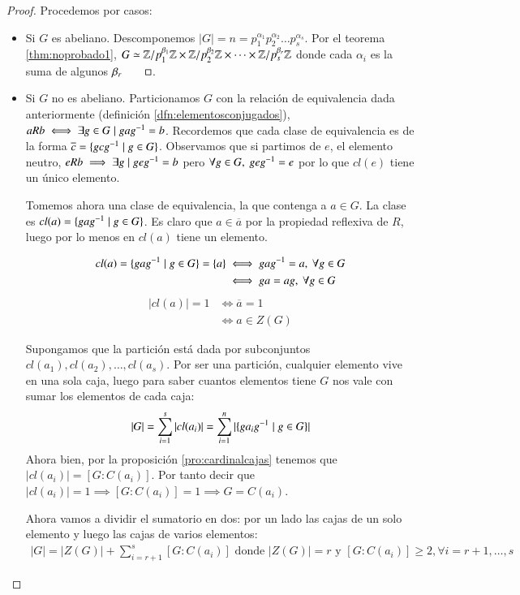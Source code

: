 \begin{proof}
	Procedemos por casos:
	\begin{itemize}
		\item Si $G$ es abeliano. Descomponemos $|G| = n = p_1^{\alpha_1}p_2^{\alpha_2}\dots p_s^{\alpha_s}$. Por el teorema \ref{thm:noprobado1}, $G \simeq \mathbb{Z}/p_1^{\beta_1}\mathbb{Z} \times \mathbb{Z}/p_2^{\beta_2}\mathbb{Z} \times \dots \times \mathbb{Z}/p_s^{\beta_r}\mathbb{Z}$ donde cada $\alpha_i$ es la suma de algunos $\beta_r \qed$.
		
		\item Si $G$ no es abeliano. Particionamos $G$ con la relación de equivalencia dada anteriormente (definición \ref{dfn:elementosconjugados}), $aRb \iff \exists g \in G \mid gag^{-1} = b$. Recordemos que cada clase de equivalencia es de la forma $\overline{c} = \{gcg^{-1} \mid g \in G\}$. Observamos que si partimos de $e$, el elemento neutro, $eRb \implies \exists g \mid geg^{-1} = b$ pero $\forall g \in G,\ geg^{-1} = e$ por lo que $cl(e)$ tiene un único elemento.
		
		Tomemos ahora una clase de equivalencia, la que contenga a $a \in G$. La clase es $cl(a) = \{gag^{-1} \mid g \in G\}$. Es claro que $a \in \overline{a}$ por la propiedad reflexiva de $R$, luego por lo menos en $cl(a)$ tiene un elemento.
		
		\begin{align*}
		cl(a) = \{gag^{-1} \mid g \in G\} = \{a\} &\iff gag^{-1} = a,\ \forall g \in G \\
		&\iff ga = ag,\ \forall g \in G
		\end{align*}
		\begin{align*}
		|cl(a)| = 1 &\iff \overline{a} = 1 \\
		&\iff a \in Z(G)
		\end{align*}
		
		Supongamos que la partición está dada por subconjuntos $cl(a_1), cl(a_2), \dots, cl(a_s)$. Por ser una partición, cualquier elemento vive en una sola caja, luego para saber cuantos elementos tiene $G$ nos vale con sumar los elementos de cada caja:
		\begin{align*}
		|G| = \sum_{i = 1}^{s} |cl(a_i)| = \sum_{i = 1}^n |\{ga_ig^{-1} \mid g \in G\}|
		\end{align*}
		Ahora bien, por la proposición \ref{pro:cardinalcajas} tenemos que $|cl(a_i)| = [G:C(a_i)]$. Por tanto decir que $|cl(a_i)| = 1 \implies [G:C(a_i)] = 1 \implies G = C(a_i)$.
		
		Ahora vamos a dividir el sumatorio en dos: por un lado las cajas de un solo elemento y luego las cajas de varios elementos:
		\begin{align}
		\label{eq:thmcauchy}
		|G| = |Z(G)| + \sum_{i = r + 1}^{s} [G : C(a_i)] \text{ donde } |Z(G)| = r \text{ y } [G : C(a_i)] \geq 2, \forall i = r+1,\dots, s
		\end{align}
		

\end{itemize}
\end{proof}
